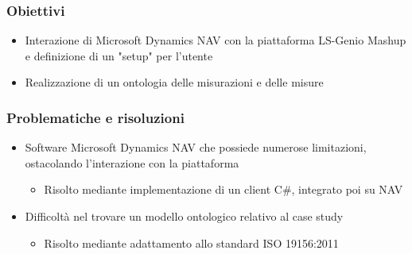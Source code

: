 \documentclass{beamer}
\begin{document}

\begin{frame}
\frametitle{Obiettivi}
\begin{itemize}
	\item Interazione di Microsoft Dynamics NAV con la piattaforma LS-Genio Mashup e definizione di un "setup" per l'utente
	
	
	\item Realizzazione di un ontologia delle misurazioni e delle misure
\end{itemize}	
\end{frame}

\begin{frame}
\frametitle{Problematiche e risoluzioni}
\begin{itemize}
\item Software Microsoft Dynamics NAV che possiede numerose limitazioni, ostacolando l'interazione con la piattaforma
\begin{itemize}
	\item Risolto mediante implementazione di un client C\#, integrato poi su NAV
\end{itemize}


\item Difficoltà nel trovare un modello ontologico relativo al case study
\begin{itemize}
	\item Risolto mediante adattamento allo standard ISO 19156:2011
\end{itemize}
\end{itemize}	
\end{frame}
\end{document}
